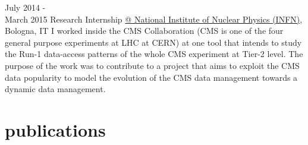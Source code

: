 \documentclass[]{cv-style}     %
\begin{document}
\begin{entrylist}
\entry
{July 2014 -\\March 2015}
{Research Internship}
{\href{http://home.infn.it/it/}{@ National Institute of Nuclear Physics (INFN)}, Bologna, IT}
{
I worked inside the CMS Collaboration (CMS is one of the four general purpose
    experiments at LHC at CERN) at one tool that intends to study the Run-1
    data-access patterns of the whole CMS experiment at Tier-2 level.
    The purpose of the work was to contribute to a project that aims to
    exploit the CMS data popularity to model the evolution of the CMS
data management towards a dynamic data management.
}
\end{entrylist}



\pagebreak
\section{publications}

\end{document}
